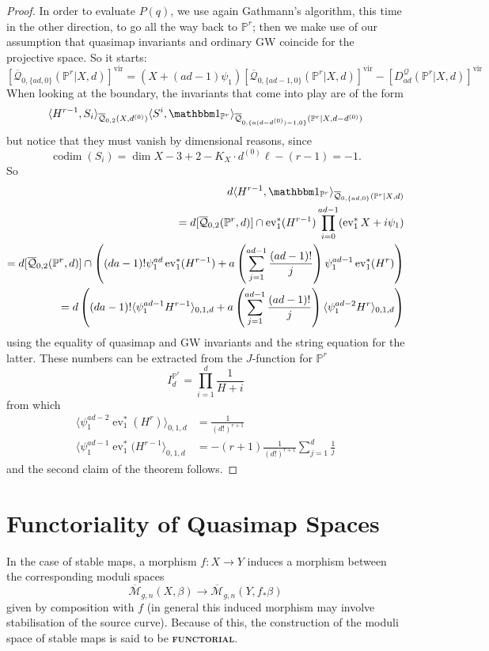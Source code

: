 \documentclass[11pt]{amsart}
\newcommand{\M}[4]{\overline{\mathcal M}_{#1,#2}(#3,#4)}
\newcommand{\Q}[4]{\overline{\mathcal Q}_{#1,#2}(#3,#4)}
\newcommand{\PP}{\mathbb P}
\renewcommand{\to}{\rightarrow}
\newcommand{\ev}{\operatorname{ev}}
\newcommand{\codim}{\operatorname{codim}}
\newcommand{\ildef}[1]{\textbf{\textsc{#1}}}
\theoremstyle{plain}
\theoremstyle{definition}
\begin{document}
\begin{proof}
In order to evaluate $P(q)$, we use again Gathmann's algorithm, this time in the other direction, to go all the way back to $\PP^r$; then we make use of our assumption that quasimap invariants and ordinary GW coincide for the projective space. So it starts:
\[
 [\Q{0}{\{ad,0\}}{\PP^r|X}{d}]^\text{vir}=(X+(ad-1)\psi_1)[\Q{0}{\{ad-1,0\}}{\PP^r|X}{d}]^\text{vir}-[D_{ad}^{\mathcal Q}(\PP^r|X,d)]^\text{vir}
\]
When looking at the boundary, the invariants that come into play are of the form
\[
 \langle H^{r-1},S_i\rangle_{\Q{0}{2}{X}{d^{(0)}}}\langle S^i,\mathbbm 1_{\PP^r}\rangle_{\Q{0}{\{a(d-d^{(0)})-1,0\}}{\PP^r|X}{d-d^{(0)}}}
\]
but notice that they must vanish by dimensional reasons, since
\[
 \codim(S_i)=\dim X-3+2-K_X\cdot d^{(0)}\ell-(r-1)=-1.
\]
So
\begin{align*}
 d\langle H^{r-1},\mathbbm 1_{\PP^r}\rangle_{\Q{0}{\{ad,0\}}{\PP^r|X}{d}} \\
 = d[\Q{0}{2}{\PP^r}{d}]\cap\ev_1^*(H^{r-1})\prod_{i=0}^{ad-1}(\ev_1^*X+i\psi_1) \\
 = d[\Q{0}{2}{\PP^r}{d}]\cap\left((da-1)!\psi_1^{ad}\ev_1^*(H^{r-1})+a\left(\sum_{j=1}^{ad-1}\frac{(ad-1)!}{j}\right)\psi_1^{ad-1}\ev_1^*(H^{r})\right) \\
 = d\left((da-1)!\langle \psi_1^{ad-1}H^{r-1}\rangle_{0,1,d}+a\left(\sum_{j=1}^{ad-1}\frac{(ad-1)!}{j}\right)\langle\psi_1^{ad-2}H^{r}\rangle_{0,1,d}\right)
\end{align*}
using the equality of quasimap and GW invariants and the string equation for the latter. These numbers can be extracted from the $J$-function for $\PP^r$
\[
 I^{\PP^r}_d=\prod_{i=1}^d\frac{1}{H+i}
\]
from which
\begin{align*}
 \langle \psi_1^{ad-2}\ev_1^*(H^{r})\rangle_{0,1,d} &=\frac{1}{(d!)^{r+1}} \\
 \langle \psi_1^{ad-1}\ev_1^*(H^{r-1}\rangle_{0,1,d} &=-(r+1)\frac{1}{(d!)^{r+1}}\sum_{j=1}^d\frac{1}{j}
\end{align*}
and the second claim of the theorem follows.
\end{proof}




\appendix
\section{Functoriality of Quasimap Spaces} \label{Functoriality of Quasimap Spaces Section}

In the case of stable maps, a morphism $f : X \to Y$ induces a morphism between the corresponding moduli spaces
\begin{equation*}\M{g}{n}{X}{\beta} \rightarrow \M{g}{n}{Y}{f_* \beta} \end{equation*}
given by composition with $f$ (in general this induced morphism may involve stabilisation of the source curve). Because of this, the construction of the moduli space of stable maps is said to be \ildef{functorial}.
\end{document}
